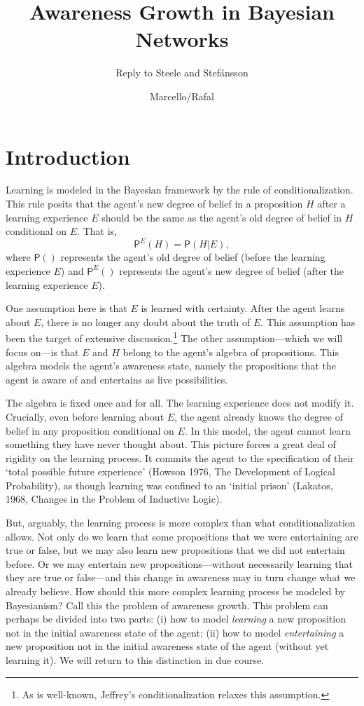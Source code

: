 \documentclass[
  11pt,
  dvipsnames,enabledeprecatedfontcommands]{scrartcl}
\title{Awareness Growth in Bayesian Networks}
\subtitle{Reply to Steele and Stefánsson}
\author{Marcello/Rafal}
\date{}
\newcommand{\pr}[1]{\ensuremath{\mathsf{P}(#1)}}
\newcommand{\ppr}[2]{\ensuremath{\mathsf{P}^{#1}(#2)}}
\begin{document}
\maketitle

\hypertarget{introduction}{%
\section{Introduction}\label{introduction}}

Learning is modeled in the Bayesian framework by the rule of
conditionalization. This rule posits that the agent's new degree of
belief in a proposition \(H\) after a learning experience \(E\) should
be the same as the agent's old degree of belief in \(H\) conditional on
\(E\). That is, \[\ppr{E}{H}=\pr{H \vert E},\] where \(\pr{}\)
represents the agent's old degree of belief (before the learning
experience \(E\)) and \(\ppr{E}{}\) represents the agent's new degree of
belief (after the learning experience \(E\)).

One assumption here is that \(E\) is learned with certainty. After the
agent learns about \(E\), there is no longer any doubt about the truth
of \(E\). This assumption has been the target of extensive
discussion.\footnote{As is well-known, Jeffrey's conditionalization
  relaxes this assumption.} The other assumption---which we will focus
on---is that \(E\) and \(H\) belong to the agent's algebra of
propositions. This algebra models the agent's awareness state, namely
the propositions that the agent is aware of and entertains as live
possibilities.

The algebra is fixed once and for all. The learning experience does not
modify it. Crucially, even before learning about \(E\), the agent
already knows the degree of belief in any proposition conditional on
\(E\). In this model, the agent cannot learn something they have never
thought about. This picture forces a great deal of rigidity on the
learning process. It commits the agent to the specification of their
`total possible future experience' (Howson 1976, The Development of
Logical Probability), as though learning was confined to an `initial
prison' (Lakatos, 1968, Changes in the Problem of Inductive Logic).

But, arguably, the learning process is more complex than what
conditionalization allows. Not only do we learn that some propositions
that we were entertaining are true or false, but we may also learn new
propositions that we did not entertain before. Or we may entertain new
propositions---without necessarily learning that they are true or
false---and this change in awareness may in turn change what we already
believe. How should this more complex learning process be modeled by
Bayesianism? Call this the problem of awareness growth. This problem can
perhaps be divided into two parts: (i) how to model \textit{learning} a
new proposition not in the initial awareness state of the agent; (ii)
how to model \textit{entertaining} a new proposition not in the initial
awareness state of the agent (without yet learning it). We will return
to this distinction in due course.
\end{document}
